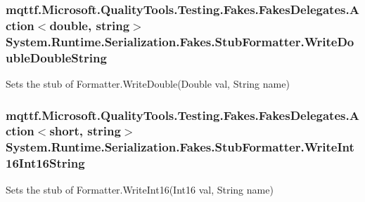 \hypertarget{class_system_1_1_runtime_1_1_serialization_1_1_fakes_1_1_stub_formatter_a347bddee74ac70c15d43943c6580fd29}{
\subsubsection[{Write\-Double\-Double\-String}]{\setlength{\rightskip}{0pt plus 5cm}mqttf.\-Microsoft.\-Quality\-Tools.\-Testing.\-Fakes.\-Fakes\-Delegates.\-Action$<$double, string$>$ System.\-Runtime.\-Serialization.\-Fakes.\-Stub\-Formatter.\-Write\-Double\-Double\-String}}\label{class_system_1_1_runtime_1_1_serialization_1_1_fakes_1_1_stub_formatter_a347bddee74ac70c15d43943c6580fd29}


Sets the stub of Formatter.\-Write\-Double(\-Double val, String name)

\hypertarget{class_system_1_1_runtime_1_1_serialization_1_1_fakes_1_1_stub_formatter_a4bfb31cd67b4184473ef7877f3af5a29}{
\subsubsection[{Write\-Int16\-Int16\-String}]{\setlength{\rightskip}{0pt plus 5cm}mqttf.\-Microsoft.\-Quality\-Tools.\-Testing.\-Fakes.\-Fakes\-Delegates.\-Action$<$short, string$>$ System.\-Runtime.\-Serialization.\-Fakes.\-Stub\-Formatter.\-Write\-Int16\-Int16\-String}}\label{class_system_1_1_runtime_1_1_serialization_1_1_fakes_1_1_stub_formatter_a4bfb31cd67b4184473ef7877f3af5a29}


Sets the stub of Formatter.\-Write\-Int16(\-Int16 val, String name)


